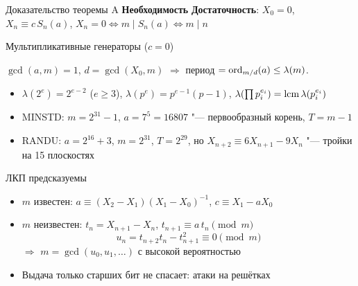 \documentclass{ca-slides}
\begin{document}
\begin{canvasframe}{Доказательство теоремы A}
  \textbf{Необходимость}
  \penspace[0.3\textheight]
  \textbf{Достаточность}: $X_0 = 0$, $X_n \equiv c\,S_n(a)$, \quad
  $X_n = 0 \iff m \mid S_n(a) \iff m \mid n$
  \penspace[0.25\textheight]
\end{canvasframe}

\begin{canvasframe}{Мультипликативные генераторы ($c = 0$)}
  \begin{proposition}
    $\gcd(a, m) = 1$, $d = \gcd(X_0, m)$ $\Rightarrow$ период $= \operatorname{ord}_{m/d}(a) \le \lambda(m)$.
  \end{proposition}
  \begin{itemize}
    \item $\lambda(2^e) = 2^{e-2}$ ($e \ge 3$), $\lambda(p^e) = p^{e-1}(p-1)$,
      $\lambda(\prod p_i^{e_i}) = \operatorname{lcm} \lambda(p_i^{e_i})$
    \item MINSTD: $m = 2^{31} - 1$, $a = 7^5 = 16807$ "--- первообразный корень, $T = m - 1$
    \item RANDU: $a = 2^{16} + 3$, $m = 2^{31}$, $T = 2^{29}$, но
      $X_{n+2} \equiv 6X_{n+1} - 9X_n$ "--- тройки на 15 плоскостях
  \end{itemize}
\end{canvasframe}

\begin{canvasframe}{ЛКП предсказуемы}
  \begin{itemize}
    \item $m$ известен: $a \equiv (X_2 - X_1)(X_1 - X_0)^{-1}$, $c \equiv X_1 - a X_0$
    \item $m$ неизвестен: $t_n = X_{n+1} - X_n$, \quad $t_{n+1} \equiv a\, t_n \pmod m$
      \[u_n = t_{n+2} t_n - t_{n+1}^2 \equiv 0 \pmod m\]
      $\Rightarrow$ $m = \gcd(u_0, u_1, \dots)$ с высокой вероятностью
    \item Выдача только старших бит не спасает: атаки на решётках
  \end{itemize}
  \notearea[0.25\textheight]
\end{canvasframe}
\end{document}
